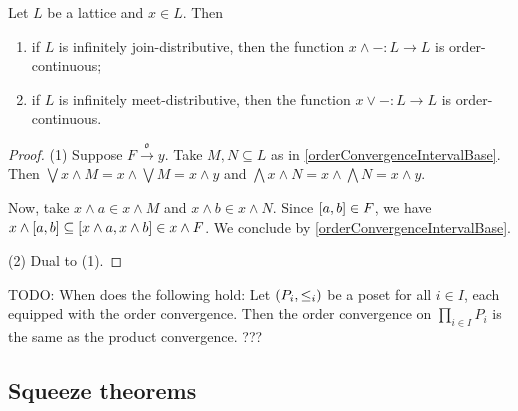 \begin{proposition} \label{singleArgumentMeetJoinOrderContinuous}
Let $L$ be a lattice and $x\in L$. Then
\begin{enumerate}
\item if $L$ is infinitely join-distributive, then the function $x\wedge -: L\to L$ is order-continuous;
\item if $L$ is infinitely meet-distributive, then the function $x\vee -: L\to L$ is order-continuous.
\end{enumerate}
\end{proposition}
\begin{proof}
(1) Suppose $F\overset{\mathfrak{o}}{\longrightarrow} y$. Take $M,N\subseteq L$ as in \ref{orderConvergenceIntervalBase}. Then $\bigvee x\wedge M = x\wedge \bigvee M = x\wedge y$ and $\bigwedge x\wedge N = x\wedge \bigwedge N = x\wedge y$.

Now, take $x\wedge a \in x\wedge M$ and $x\wedge b \in x\wedge N$. Since $\interval{a, b} \in F$, we have $x\wedge \interval{a,b} \subseteq \interval{x\wedge a, x\wedge b} \in x\wedge F$. We conclude by \ref{orderConvergenceIntervalBase}.

(2) Dual to (1).
\end{proof}


TODO: When does the following hold: Let $\sSet{P_i, \leq_i}$ be a poset for all $i\in I$, each equipped with the order convergence. Then the order convergence on $\prod_{i\in I}P_i$ is the same as the product convergence. ???

\subsection{Squeeze theorems}

